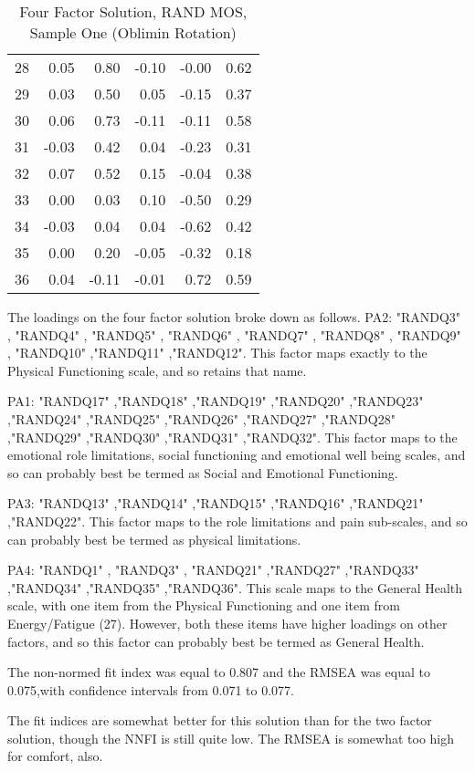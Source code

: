 \documentclass{article}
\begin{document}
\begin{table}[ht]
\begin{tabular}{rrrrrr}
  28 & 0.05 & 0.80 & -0.10 & -0.00 & 0.62 \\ 
  29 & 0.03 & 0.50 & 0.05 & -0.15 & 0.37 \\ 
  30 & 0.06 & 0.73 & -0.11 & -0.11 & 0.58 \\ 
  31 & -0.03 & 0.42 & 0.04 & -0.23 & 0.31 \\ 
  32 & 0.07 & 0.52 & 0.15 & -0.04 & 0.38 \\ 
  33 & 0.00 & 0.03 & 0.10 & -0.50 & 0.29 \\ 
  34 & -0.03 & 0.04 & 0.04 & -0.62 & 0.42 \\ 
  35 & 0.00 & 0.20 & -0.05 & -0.32 & 0.18 \\ 
  36 & 0.04 & -0.11 & -0.01 & 0.72 & 0.59 \\ 
   \hline
\end{tabular}
\caption{Four Factor Solution, RAND MOS, Sample One (Oblimin Rotation)} 
\label{tab:rand4fact}
\end{table}
The loadings on the four factor solution broke down as follows. 
PA2: "RANDQ3" , "RANDQ4" , "RANDQ5" , "RANDQ6" , "RANDQ7" , "RANDQ8" , "RANDQ9" , "RANDQ10" ,"RANDQ11" ,"RANDQ12". This factor maps exactly to the Physical Functioning scale, and so retains that name. 

PA1: "RANDQ17" ,"RANDQ18" ,"RANDQ19" ,"RANDQ20" ,"RANDQ23" ,"RANDQ24" ,"RANDQ25" ,"RANDQ26" ,"RANDQ27" ,"RANDQ28" ,"RANDQ29" ,"RANDQ30" ,"RANDQ31" ,"RANDQ32". This factor maps to the emotional role limitations, social functioning and emotional well being scales, and so can probably best be termed as Social and Emotional Functioning. 

PA3: "RANDQ13" ,"RANDQ14" ,"RANDQ15" ,"RANDQ16" ,"RANDQ21" ,"RANDQ22". This factor maps to the role limitations and pain sub-scales, and so can probably best be termed as physical limitations. 

PA4: "RANDQ1" , "RANDQ3" , "RANDQ21" ,"RANDQ27" ,"RANDQ33" ,"RANDQ34" ,"RANDQ35" ,"RANDQ36". This scale maps to the General Health scale, with one item from the Physical Functioning and one item from Energy/Fatigue (27). However, both these items have higher loadings on other factors, and so this factor can probably best be termed as General Health. 



The non-normed fit index was equal to 0.807
and the RMSEA was equal to 0.075,with confidence intervals from 0.071 to 0.077.

The fit indices are somewhat better for this solution than for the two factor solution, though the NNFI is still quite low. The RMSEA is somewhat too high for comfort, also. 
\end{document}
